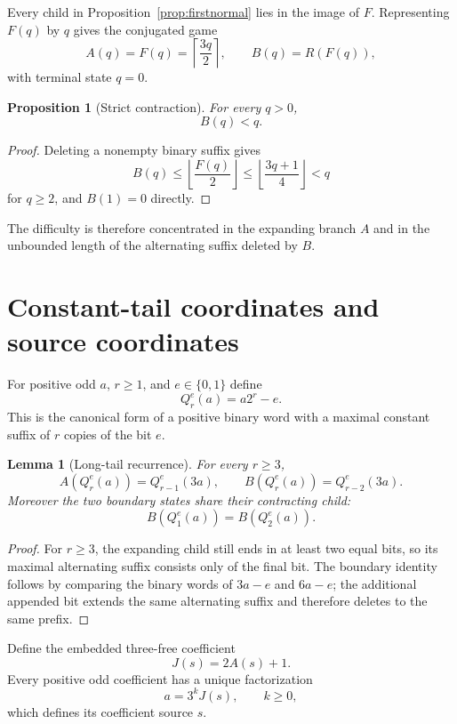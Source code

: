 \documentclass[11pt]{article}
\newtheorem{lemma}[theorem]{Lemma}
\newtheorem{proposition}[theorem]{Proposition}
\begin{document}
Every child in Proposition~\ref{prop:firstnormal} lies in the image of $F$.
Representing $F(q)$ by $q$ gives the conjugated game
\[
  A(q)=F(q)=\left\lceil\frac{3q}{2}\right\rceil,
  \qquad B(q)=R(F(q)),
\]
with terminal state $q=0$.

\begin{proposition}[Strict contraction]\label{prop:Bcontracts}
For every $q>0$,
\[
  B(q)<q.
\]
\end{proposition}

\begin{proof}
Deleting a nonempty binary suffix gives
\[
 B(q)\le \left\lfloor\frac{F(q)}2\right\rfloor
 \le \left\lfloor\frac{3q+1}{4}\right\rfloor<q
\]
for $q\ge2$, and $B(1)=0$ directly.
\end{proof}

The difficulty is therefore concentrated in the expanding branch $A$ and in
the unbounded length of the alternating suffix deleted by $B$.

\section{Constant-tail coordinates and source coordinates}

For positive odd $a$, $r\ge1$, and $e\in\{0,1\}$ define
\[
  Q_r^e(a)=a2^r-e.
\]
This is the canonical form of a positive binary word with a maximal constant
suffix of $r$ copies of the bit $e$.

\begin{lemma}[Long-tail recurrence]\label{lem:longtail}
For every $r\ge3$,
\[
 \boxed{
 A(Q_r^e(a))=Q_{r-1}^e(3a),\qquad
 B(Q_r^e(a))=Q_{r-2}^e(3a).}
\]
Moreover the two boundary states share their contracting child:
\[
 \boxed{B(Q_1^e(a))=B(Q_2^e(a)).}
\]
\end{lemma}

\begin{proof}
For $r\ge3$, the expanding child still ends in at least two equal bits, so
its maximal alternating suffix consists only of the final bit. The boundary
identity follows by comparing the binary words of $3a-e$ and $6a-e$; the
additional appended bit extends the same alternating suffix and therefore
deletes to the same prefix.
\end{proof}

Define the embedded three-free coefficient
\[
  J(s)=2A(s)+1.
\]
Every positive odd coefficient has a unique factorization
\[
  a=3^kJ(s),\qquad k\ge0,
\]
which defines its coefficient source $s$.
\end{document}
